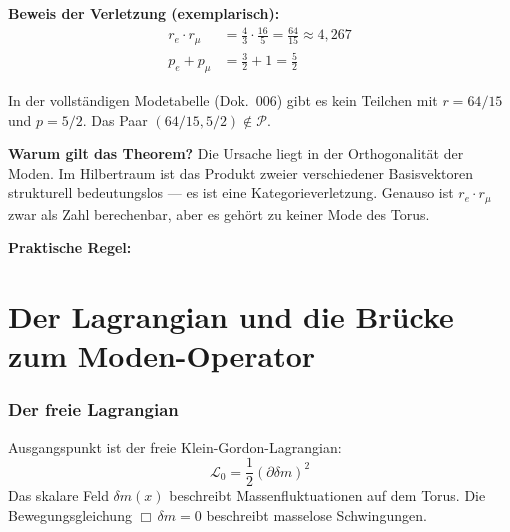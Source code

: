 \textbf{Beweis der Verletzung (exemplarisch):}
\begin{align*}
  r_e \cdot r_\mu &= \frac{4}{3} \cdot \frac{16}{5} = \frac{64}{15}
  \approx 4{,}267 \\
  p_e + p_\mu &= \frac{3}{2} + 1 = \frac{5}{2}
\end{align*}

In der vollständigen Modetabelle (Dok.~006) gibt es kein Teilchen
mit $r = 64/15$ und $p = 5/2$. Das Paar $(64/15, 5/2) \notin \mathcal{P}$.

\textbf{Warum gilt das Theorem?} Die Ursache liegt in der
Orthogonalität der Moden. Im Hilbertraum ist das Produkt zweier
verschiedener Basisvektoren strukturell bedeutungslos — es ist eine
Kategorieverletzung. Genauso ist $r_e \cdot r_\mu$ zwar als Zahl
berechenbar, aber es gehört zu keiner Mode des Torus.

\textbf{Praktische Regel:}

\begin{center}
{\footnotesize
{}
}
\end{center}

\part{Der Lagrangian und die Brücke zum Moden-Operator}

\section{Der freie Lagrangian}

Ausgangspunkt ist der freie Klein-Gordon-Lagrangian:
\begin{equation}
  \mathcal{L}_0 = \frac{1}{2}(\partial\delta m)^2
\end{equation}
Das skalare Feld $\delta m(x)$ beschreibt Massenfluktuationen auf dem Torus.
Die Bewegungsgleichung $\Box\,\delta m = 0$ beschreibt masselose Schwingungen.

